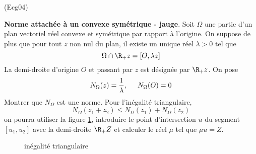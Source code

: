 \begin{tiny}(Ecg04)\end{tiny}
\textbf{Norme attachée à un convexe symétrique - jauge}.\newline
Soit $\Omega$ une partie d'un plan vectoriel réel convexe et symétrique par rapport à l'origine. On suppose de plus que pour tout $z$ non nul du plan, il existe un unique réel $\lambda>0$ tel que
\[\Omega \cap \R_+z=\left[ O,\lambda z \right] \]
La demi-droite d'origine $O$ et passant par $z$ est désignée par $\R_+z$. On pose
\begin{displaymath}
N_\Omega(z)=\frac{1}{\lambda}, \hspace{0.5cm} N_\Omega(O)=0 
\end{displaymath}
Montrer que $N_\Omega$ est une norme. Pour l'inégalité triangulaire, 
\begin{displaymath}
 N_\Omega(z_1 + z_2) \leq N_\Omega(z_1) + N_\Omega(z_2)
\end{displaymath}
on pourra utiliser la figure \ref{fig:Ecg04_1}, introduire le point d'intersection $u$ du segment $[u_1,u_2]$ avec la demi-droite $\R_+ Z$ et calculer le réel $\mu$ tel que $\mu u = Z$.
\begin{figure}[ht]
\centering

\caption{inégalité triangulaire}
\label{fig:Ecg04_1}
\end{figure}